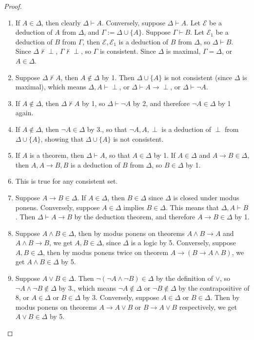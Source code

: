 \documentclass[12pt]{article}
\begin{document}
\begin{proof}
\begin{enumerate}
\item If $A\in \Delta$, then clearly $\Delta \vdash A$.  Conversely, suppose $\Delta\vdash A$.  Let $\mathcal{E}$ be a deduction of $A$ from $\Delta$, and $\Gamma:=\Delta\cup \lbrace A\rbrace$.  Suppose $\Gamma \vdash B$.  Let $\mathcal{E}_1$ be a deduction of $B$ from $\Gamma$, then $\mathcal{E},\mathcal{E}_1$ is a deduction of $B$ from $\Delta$, so $\Delta\vdash B$.  Since $\Delta\not\vdash \perp$, $\Gamma\not\vdash \perp$, so $\Gamma$ is consistent.  Since $\Delta$ is maximal, $\Gamma=\Delta$, or $A\in \Delta$.
\item Suppose $\Delta\not \vdash A$, then $A\notin \Delta$ by 1.  Then $\Delta\cup\lbrace A\rbrace$ is not consistent (since $\Delta$ is maximal), which means $\Delta,A\vdash \perp$, or $\Delta\vdash A\to \perp$, or $\Delta\vdash \neg A$.
\item If $A\notin \Delta$, then $\Delta\not\vdash A$ by 1, so $\Delta\vdash \neg A$ by 2, and therefore $\neg A\in \Delta$ by 1 again.
\item If $A\notin \Delta$, then $\neg A\in \Delta$ by 3., so that $\neg A, A, \perp$ is a deduction of $\perp$ from $\Delta \cup \lbrace A\rbrace$, showing that $\Delta \cup \lbrace A\rbrace$ is not consistent.
\item If $A$ is a theorem, then $\Delta \vdash A$, so that $A\in \Delta$ by 1.  If $A \in \Delta$ and $A\to B \in \Delta$, then $A,A\to B, B$ is a deduction of $B$ from $\Delta$, so $B\in \Delta$ by 1.
\item This is true for any consistent set.
\item Suppose $A\to B\in \Delta$.  If $A\in \Delta$, then $B \in \Delta$ since $\Delta$ is closed under modus ponens.  Conversely, suppose $A\in \Delta$ implies $B\in \Delta$.  This means that $\Delta, A\vdash B$.  Then $\Delta \vdash A\to B$ by the deduction theorem, and therefore $A\to B\in \Delta$ by 1.
\item Suppose $A\land B\in \Delta$, then by modus ponens on theorems $A\land B\to A$ and $A\land B\to B$, we get $A,B\in \Delta$, since $\Delta$ is a logic by 5.  Conversely, suppose $A,B\in \Delta$, then by modus ponens twice on theorem $A\to (B\to A\land B)$, we get $A\land B\in \Delta$ by 5.
\item Suppose $A\lor B\in \Delta$.  Then $\neg (\neg A \land \neg B) \in \Delta$ by the definition of $\lor$, so $\neg A \land \neg B \notin \Delta$ by 3., which means $\neg A\notin \Delta$ or $\neg B\notin \Delta$ by the contrapositive of 8, or $A\in \Delta$ or $B\in \Delta$ by 3.  Conversely, suppose $A\in \Delta$ or $B\in \Delta$.  Then by modus ponens on theorems $A\to A\lor B$ or $B\to A\lor B$ respectively, we get $A\lor B\in \Delta$ by 5.
\end{enumerate}
\end{proof}
\end{document}
